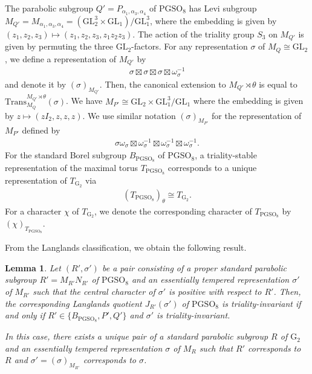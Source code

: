 \documentclass[12pt]{amsart}
\theoremstyle{definition}
\theoremstyle{plain}
\newtheorem{lemma}[definition]{Lemma}
\theoremstyle{remark}
\def\GL{\mathrm{GL}}
\def\PGSO{\mathrm{PGSO}}
\numberwithin{equation}{section}
\newcommand{\rG}{\mathrm{G}}
\newcommand{\Trans}{\mathrm{Trans}}
\begin{document}
The parabolic subgroup $Q' = P_{\alpha_1, \alpha_3, \alpha_4}$ of $\PGSO_8$ has Levi subgroup $M_{Q'} = M_{\alpha_1, \alpha_3, \alpha_4} = (\GL_2^3 \times \GL_1)/ \GL_1^3$, where the embedding is given by $(z_1, z_2, z_3) \mapsto (z_1, z_2, z_3, z_1 z_2 z_3)$.
The action of the triality group $S_3$ on $M_{Q'}$ is given by permuting the three $\GL_2$-factors.
For any representation $\sigma$ of $M_Q \cong \GL_2$, we define a  representation of $M_{Q'}$ by
\begin{align*}
      \sigma \boxtimes \sigma \boxtimes \sigma \boxtimes \omega_{\sigma}^{-1}
\end{align*}
and denote it by $(\sigma)_{M_{Q'}}$. 
Then, the canonical extension to $M_{Q'} \rtimes \theta$ is equal to $\Trans_{M_{Q}}^{M_{Q'} \rtimes \theta}(\sigma)$.
We have $M_{P'} \cong \GL_2 \times \GL_1^3/\GL_1$ where the embedding is given by $z \mapsto (zI_2, z, z, z)$.
We use similar notation $(\sigma)_{M_{P'}}$ for the representation of $M_{P'}$ defined by
\begin{align*}
      \sigma \omega_{\sigma} \boxtimes \omega_{\sigma}^{-1} \boxtimes \omega_{\sigma}^{-1} \boxtimes \omega_{\sigma}^{-1}.
\end{align*}
For the standard Borel subgroup $B_{\PGSO_8}$ of $\PGSO_8$, a triality-stable representation of the maximal torus $T_{\PGSO_8}$ corresponds to a unique representation of $T_{\rG_2}$ via 
\begin{align*}
      (T_{\PGSO_8})_{\theta} \cong T_{\rG_2}.
\end{align*}
For a character $\chi$ of $T_{\rG_2}$, we denote the corresponding character of $T_{\PGSO_8}$ by $(\chi)_{T_{\PGSO_8}}$.

From the Langlands classification, we obtain the following result.
\begin{lemma}\label{lem:triality-invariant-non-tempered}
      Let $(R', \sigma')$ be a pair consisting of a proper standard parabolic subgroup $R' = M_{R'} N_{R'}$ of $\PGSO_8$ and an essentially tempered representation $\sigma'$ of $M_{R'}$ such that the central character of $\sigma'$ is positive with respect to $R'$. Then, the corresponding Langlands quotient $J_{R'}(\sigma')$ of $\PGSO_8$ is triality-invariant if and only if $R' \in \{B_{\PGSO_8}, P', Q' \}$ and $\sigma'$ is triality-invariant.

      In this case, there exists a unique pair of a standard parabolic subgroup $R$ of $\rG_2$ and an essentially tempered representation $\sigma$ of $M_R$ such that  $R'$ corresponds to $R$ and $\sigma' = (\sigma)_{M_{R'}}$ corresponds to $\sigma$.
\end{lemma}
\end{document}
